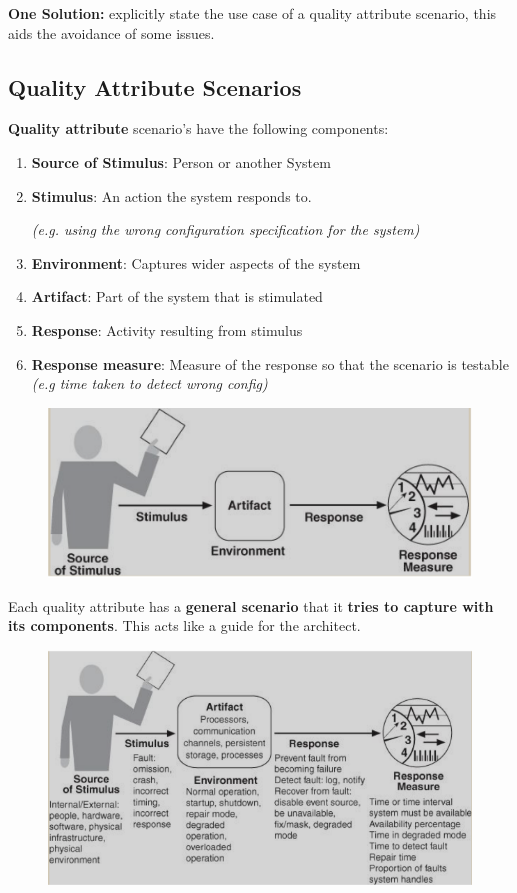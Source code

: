 \documentclass[a4paper]{article}
\begin{document}
\textbf{One Solution: } explicitly state the use case of a quality attribute scenario, this aids the avoidance of some issues.

\subsection{Quality Attribute Scenarios}
\textbf{Quality attribute} scenario's have the following components:
\begin{enumerate}
\item \textbf{Source of Stimulus}: Person or another System
\item \textbf{Stimulus}: An action the system responds to. 

\textit{(e.g. using the wrong configuration specification for the system)}
\item \textbf{Environment}: Captures wider aspects of the system
\item \textbf{Artifact}: Part of the system that is stimulated
\item \textbf{Response}: Activity resulting from stimulus
\item \textbf{Response measure}: Measure of the response so that the scenario is testable \textit{(e.g time taken to detect wrong config)}
\end{enumerate}

\begin{figure}[H]
\centering 
\includegraphics[scale=0.7]{images/QA-general.png}
\end{figure}

Each quality attribute has a \textbf{general scenario} that it \textbf{tries to capture with its components}. This acts like a guide for the architect.

\begin{figure}[H]
\centering 
\includegraphics[scale=0.7]{images/availability-general.png}
\end{figure}
\end{document}
